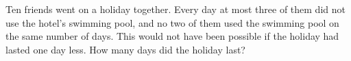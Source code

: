 Ten friends went on a holiday together. Every day at most three of them did not use the hotel's swimming pool, and no two of them used the swimming pool on the same number of days. This would not have been possible if the holiday had lasted one day less. How many days did the holiday last?
